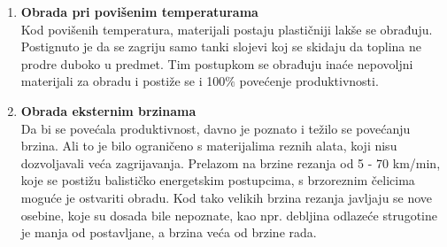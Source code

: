 \documentclass[a4paper,12pt]{article}
\numberwithin{figure}{section}
\begin{document}
\begin{enumerate}
\begin{figure}[!h]
\end{figure}
\FloatBarrier
\item \textbf{Obrada pri povišenim temperaturama}\\
Kod povišenih temperatura, materijali postaju plastičniji lakše se obrađuju. Postignuto je da se zagriju samo tanki slojevi koj se skidaju da toplina ne prodre duboko u predmet. Tim postupkom se obrađuju inaće nepovoljni materijali za obradu i postiže se i 100$\%$ povećenje produktivnosti.
\item \textbf{Obrada eksternim brzinama}\\
Da bi se povećala produktivnost, davno je poznato i težilo se povećanju brzina. Ali to je bilo ograničeno s materijalima reznih alata, koji nisu dozvoljavali veća zagrijavanja. Prelazom na brzine rezanja od 5 - 70 km/min, koje se postižu balističko energetskim postupcima, s brzoreznim čelicima moguće je ostvariti obradu. Kod tako velikih brzina rezanja javljaju se nove osebine, koje su dosada bile nepoznate, kao npr. debljina odlazeće strugotine je manja od postavljane, a brzina veća od brzine rada.
\end{enumerate}
\end{document}
